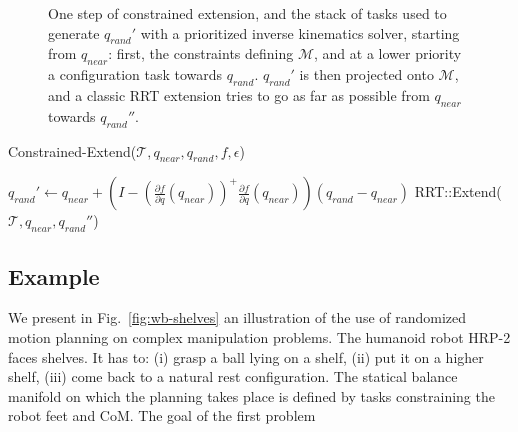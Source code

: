 \documentclass{article}
\newcommand\manifold{\mathcal{M}}
\begin{document}
\begin{figure}[h]
\begin{minipage}[c]{0.3\linewidth}
\end{minipage}

\caption{One step of constrained extension, and the stack of tasks used
  to generate $q_{rand}'$ with a prioritized inverse kinematics solver, 
  starting from $q_{near}$:
  first, the constraints defining $\manifold$, and at a lower priority
  a configuration task towards $q_{rand}$.  $q_{rand}'$ is then projected onto
  $\manifold$, and a classic RRT extension tries to go as far as possible
  from $q_{near}$ towards $q_{rand}''$.}
\label{fig:gikrrt}
\end{figure}





\begin{algorithm}[h]
  \caption{Constrained-Extend($\mathcal{T},q_{near},q_{rand},f,\epsilon$)}
  \label{alg:constrained}
  \begin{algorithmic}
    \STATE $q_{rand}' \leftarrow q_{near} +   
    \left(I -  
    \left(\frac{\partial f}{\partial q}(q_{near})\right)^{+}
    \frac{\partial f}{\partial q}(q_{near})\right) (q_{rand} - q_{near})$
    \STATE RRT::Extend($\mathcal{T},q_{near},q_{rand}''$)
    \ENDIF
  \end{algorithmic}
\end{algorithm}







\subsection{Example}

We present in Fig.~\ref{fig:wb-shelves} an illustration of 
the use of randomized motion planning 
on complex manipulation problems. The humanoid robot HRP-2 faces shelves. It has to: (i) grasp
a ball lying on a shelf, (ii) put it on a higher shelf, (iii) come back to a natural
rest configuration. The statical balance manifold on which the planning takes place is
defined by tasks constraining the robot feet and CoM. The goal of the first problem
\end{document}
